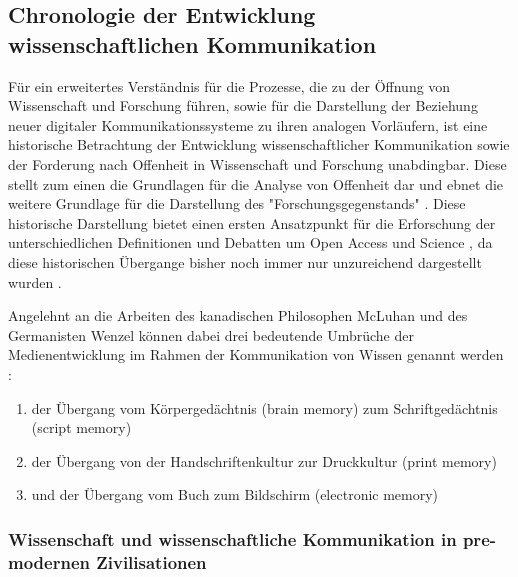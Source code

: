 \subsection{Chronologie der Entwicklung wissenschaftlichen Kommunikation}

Für ein erweitertes Verständnis für die Prozesse, die zu der Öffnung von Wissenschaft und Forschung führen, sowie für die Darstellung der Beziehung neuer digitaler Kommunikationssysteme zu ihren analogen Vorläufern, ist eine historische Betrachtung der Entwicklung wissenschaftlicher Kommunikation sowie der Forderung nach Offenheit in Wissenschaft und Forschung unabdingbar. Diese stellt zum einen die Grundlagen für die Analyse von Offenheit dar und ebnet die weitere Grundlage für die Darstellung  des "Forschungsgegenstands" \cite{cite:10}. Diese historische Darstellung bietet einen ersten Ansatzpunkt für die Erforschung der unterschiedlichen Definitionen und Debatten um Open Access und Science \cite{Scheliga_2014}, da diese historischen Übergange bisher noch immer nur unzureichend dargestellt wurden \cite{CREATe_2014}.

Angelehnt an die Arbeiten des kanadischen Philosophen McLuhan und des Germanisten Wenzel können dabei drei bedeutende Umbrüche der Medienentwicklung im Rahmen der Kommunikation von Wissen genannt werden \cite{wunderlich_2008_buchdruck} \cite{wenzel_mediengeschichte_2007}:
\begin{enumerate}
\item der Übergang vom Körpergedächtnis (brain memory) zum Schriftgedächtnis (script memory)
\item der Übergang von der Handschriftenkultur zur Druckkultur (print memory)
\item und der Übergang vom Buch zum Bildschirm (electronic memory)
\end{enumerate}

\subsubsection{Wissenschaft und wissenschaftliche Kommunikation in pre-modernen Zivilisationen}

